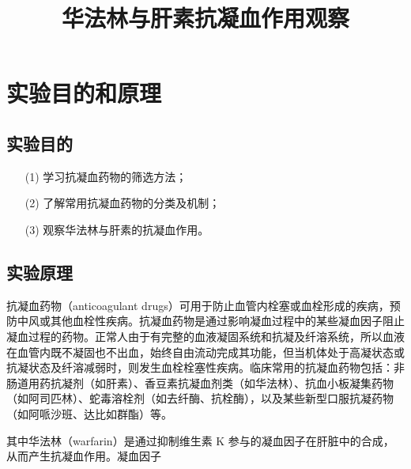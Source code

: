 \documentclass[UTF8]{ctexart}
\title{华法林与肝素抗凝血作用观察}
\author{}
\begin{document}
\date{}
\maketitle

\section{实验目的和原理}

\subsection{实验目的}

\begin{itemize}
    \item [(1)] 学习抗凝血药物的筛选方法；
    \item [(2)] 了解常用抗凝血药物的分类及机制；
    \item [(3)] 观察华法林与肝素的抗凝血作用。
\end{itemize}

\subsection{实验原理}

抗凝血药物（anticoagulant drugs）可用于防止血管内栓塞或血栓形成的疾病，预防中风或其他血栓性疾病。抗凝血药物是通过影响凝血过程中的某些凝血因子阻止凝血过程的药物。正常人由于有完整的血液凝固系统和抗凝及纤溶系统，所以血液在血管内既不凝固也不出血，始终自由流动完成其功能，但当机体处于高凝状态或抗凝状态及纤溶减弱时，则发生血栓栓塞性疾病。临床常用的抗凝血药物包括：非肠道用药抗凝剂（如肝素）、香豆素抗凝血剂类（如华法林）、抗血小板凝集药物（如阿司匹林）、蛇毒溶栓剂（如去纤酶、抗栓酶），以及某些新型口服抗凝药物（如阿哌沙班、达比如群酯）等。

其中华法林（warfarin）是通过抑制维生素 K 参与的凝血因子在肝脏中的合成，从而产生抗凝血作用。凝血因子
\end{document}
